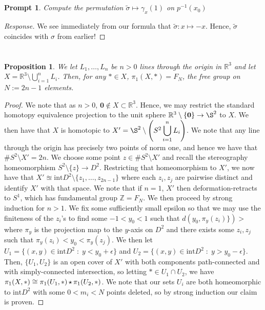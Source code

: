 \documentclass[english]{article}
\renewcommand\vec{\mathbf}
\newcommand{\RR}{\mathbb{R}}
\newcommand{\ZZ}{\mathbb{Z}}
\newcommand{\prob}[1]{\setcounter{section}{#1-1}\section{}}
\newcommand{\prt}[1]{\setcounter{subsection}{#1-1}\subsection{}}
\newtheorem*{proposition*}{Proposition}
\newtheorem*{prompt*}{Prompt}
\theoremstyle{remark}
\theoremstyle{definition}
\newcommand{\intr}{\mathrm{int}}
\newcommand{\frp}{\mathop{\large {\mathlarger{\star}}}}
\begin{document}
\prt{7}\begin{prompt*}
	Compute the permutation $\tilde\sigma\mapsto \gamma_x(1)$ on $p^{-1}(x_0)$
\end{prompt*}
\begin{proof}[Response]
	We see immediately from our formula that $\tilde\sigma:x\mapsto-x$. Hence, $\tilde\sigma$ coincides with $\sigma$ from earlier!
\end{proof}

	\prob{2} \begin{proposition*}
		We let $L_1,\hdots,L_n$ be $n>0$ lines through the origin in $\RR^3$ and let $X=\RR^3\setminus \displaystyle\bigcup_{i=1}^nL_i$. Then, for any $*\in X$, $\pi_1(X,*)=F_{N}$, the free group on $N:=2n-1$ elements.
	\end{proposition*}
\begin{proof}
	We note that as $n>0$, $\vec{0}\not \in X\subset \RR^3$. Hence, we may restrict the standard homotopy equivalence projection to the unit sphere $\RR^3\setminus \{\vec{0}\}\to \S^2$ to $X$. We then have that $X$ is homotopic to $X'=\S^2\setminus \left(S^2\displaystyle\bigcup_{i=1}^nL_i\right)$. We note that any line through the origin has precisely two points of norm one, and hence we have that $\#S^2\setminus X'=2n$. We choose some point $z\in \#S^2\setminus X'$ and recall the stereography homeomorphism $S^2\setminus \{z\}\to D^2$. Restricting that homeomorphism to $X'$, we now have that $X'\approxeq \intr D^2\setminus\{z_1,\hdots,z_{2n-1}\}$ where each $z_i,z_j$ are pairwise distinct and identify $X'$ with that space. We note that if $n=1$, $X'$ then deformation-retracts to $S^1$, which has fundamental group $\ZZ=F_{N}$. We then proceed by strong induction for $n>1$. We fix some sufficiently small epsilon so that we may use the finiteness of the $z_i$'s to find some $-1<y_0<1$ such that $d(y_0,\pi_y(z_i)\})>$ where $\pi_y$ is the projection map to the $y$-axis on $D^2$ and there exists some $z_i,z_j$ such that $\pi_y(z_i)<y_0<\pi_y(z_j)$. We then let $U_1=\{(x,y)\in \intr D^2\;:\;y<y_0+\epsilon\}$ and $U_2=\{(x,y)\in \intr D^2\;:\;y>y_0-\epsilon\}$. Then, $\{U_1,U_2\}$ is an open cover of $X'$ with both components path-connected and with simply-connected intersection, so letting $*\in U_1\cap U_2$, we have $\pi_1(X,*)\cong \pi_1(U_1,*)\frp \pi_1(U_2,*)$. We note that our sets $U_i$ are both homeomorphic to $\intr D^2$ with some $0<m_i<N$ points deleted, so by strong induction our claim is proven. 
\end{proof}
\end{document}
